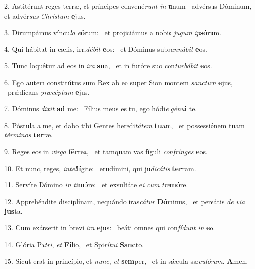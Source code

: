 2. Astitérunt reges terræ, et príncipes convené\textit{runt} \textit{in} \textbf{u}num \ast\  advérsus Dóminum, et advér\textit{sus} \textit{Chris}\textit{tum} \textbf{e}jus.\

3. Dirumpámus víncu\textit{la} \textit{e}\textbf{ó}rum: \ast\  et projiciámus a nobis \textit{ju}\textit{gum} \textit{ip}\textbf{só}rum.\

4. Qui hábitat in cælis, irri\textit{dé}\textit{bit} \textbf{e}os: \ast\  et Dóminus sub\textit{san}\textit{ná}\textit{bit} \textbf{e}os.\

5. Tunc loquétur ad eos in \textit{i}\textit{ra} \textbf{su}a, \ast\  et in furóre suo con\textit{tur}\textit{bá}\textit{bit} \textbf{e}os.\

6. Ego autem constitútus sum Rex ab eo super Sion montem \textit{sanc}\textit{tum} \textbf{e}jus, \ast\  prǽdicans \textit{præ}\textit{cép}\textit{tum} \textbf{e}jus.\

7. Dóminus \textit{di}\textit{xit} \textbf{ad} me: \ast\  Fílius meus es tu, ego hódi\textit{e} \textit{gé}\textit{nu}\textbf{i} te.\

8. Póstula a me, et dabo tibi Gentes heredi\textit{tá}\textit{tem} \textbf{tu}am, \ast\  et possessiónem tuam \textit{tér}\textit{mi}\textit{nos} \textbf{ter}ræ.\

9. Reges eos in \textit{vir}\textit{ga} \textbf{fér}rea, \ast\  et tamquam vas fíguli \textit{con}\textit{frín}\textit{ges} \textbf{e}os.\

10. Et nunc, reges, \textit{in}\textit{tel}\textbf{lí}gite: \ast\  erudímini, qui ju\textit{di}\textit{cá}\textit{tis} \textbf{ter}ram.\

11. Servíte Dómino \textit{in} \textit{ti}\textbf{mó}re: \ast\  et exsultáte e\textit{i} \textit{cum} \textit{tre}\textbf{mó}re.\

12. Apprehéndite disciplínam, nequándo iras\textit{cá}\textit{tur} \textbf{Dó}minus, \ast\  et pereátis \textit{de} \textit{vi}\textit{a} \textbf{jus}ta.\

13. Cum exárserit in brevi \textit{i}\textit{ra} \textbf{e}jus: \ast\  beáti omnes qui con\textit{fí}\textit{dunt} \textit{in} \textbf{e}o.\

14. Glória Pa\textit{tri}, \textit{et} \textbf{Fí}lio, \ast\  et Spi\textit{rí}\textit{tu}\textit{i} \textbf{Sanc}to.\

15. Sicut erat in princípio, et \textit{nunc}, \textit{et} \textbf{sem}per, \ast\  et in sǽcula sæ\textit{cu}\textit{ló}\textit{rum}. \textbf{A}men.\

